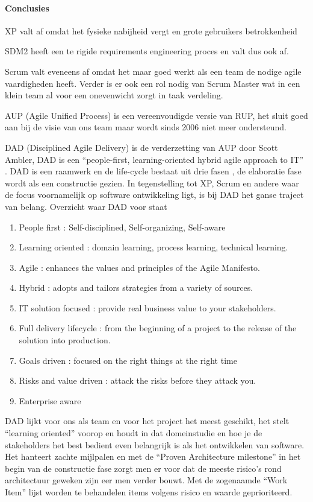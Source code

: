 \paragraph{Conclusies}
\begin{description}
\item XP valt af omdat het fysieke nabijheid vergt en grote gebruikers betrokkenheid
\item SDM2 heeft een te rigide requirements engineering proces en valt dus ook af.
\item Scrum valt eveneens af omdat het maar goed werkt als een team de nodige agile vaardigheden heeft. Verder is er ook een rol nodig van Scrum Master wat in een klein team al voor een onevenwicht zorgt in taak verdeling.
\item AUP (Agile Unified Process) is een vereenvoudigde versie van RUP, het sluit goed aan bij de visie van ons team maar wordt sinds 2006 niet meer ondersteund.
\item DAD (Disciplined Agile Delivery) is de verderzetting van AUP door Scott Ambler, DAD is een ``people-first, learning-oriented hybrid agile approach to IT'' . DAD is een raamwerk en de life-cycle bestaat uit drie fasen , de elaboratie fase wordt als een constructie gezien. In tegenstelling tot XP, Scrum en andere waar de focus voornamelijk op software ontwikkeling ligt, is bij DAD het ganse traject van belang.
Overzicht waar DAD voor staat
	\begin{enumerate}
		\item People first : Self-disciplined, Self-organizing, Self-aware
		\item Learning oriented : domain learning, process learning, technical learning.
		\item Agile : enhances the values and principles of the Agile Manifesto.
		\item Hybrid : adopts and tailors strategies from a variety of sources.
		\item IT solution focused :  provide real business value to your stakeholders.
		\item Full delivery lifecycle : from the beginning of a project to the release of the solution into production.
		\item Goals driven : focused on the right things at the right time
		\item Risks and value driven : attack the risks before they attack you.
		\item Enterprise aware
	\end{enumerate}


DAD lijkt voor ons als team en voor het project het meest geschikt, het stelt
``learning oriented'' voorop en houdt in dat domeinstudie en hoe je de stakeholders
het best bedient even belangrijk is als het ontwikkelen van software. Het hanteert
zachte mijlpalen en met de ``Proven Architecture milestone''  in het begin van de
constructie fase zorgt men er voor dat de meeste risico's rond architectuur geweken
zijn eer men verder bouwt. Met de zogenaamde ``Work Item''  lijst worden te behandelen
items volgens risico en waarde geprioriteerd.

\end{description}